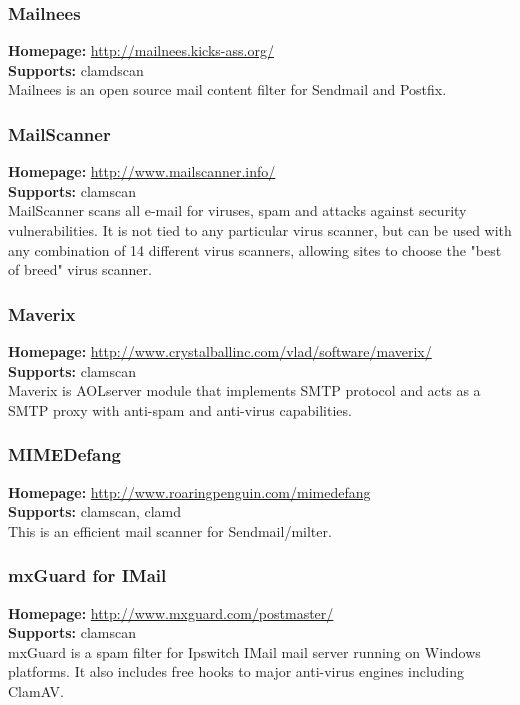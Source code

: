 \documentclass[a4paper,titlepage,12pt]{article}
\begin{document}
    \subsubsection{Mailnees}
    \textbf{Homepage:} \url{http://mailnees.kicks-ass.org/}\\
    \textbf{Supports:} clamdscan\\[4pt]
    Mailnees is an open source mail content filter for Sendmail and Postfix.

    \subsubsection{MailScanner}
    \textbf{Homepage:} \url{http://www.mailscanner.info/}\\
    \textbf{Supports:} clamscan\\[4pt]
    MailScanner scans all e-mail for viruses, spam and attacks against
    security vulnerabilities. It is not tied to any particular virus
    scanner, but can be used with any combination of 14 different virus
    scanners, allowing sites to choose the "best of breed" virus scanner.

    \subsubsection{Maverix}
    \textbf{Homepage:} \url{http://www.crystalballinc.com/vlad/software/maverix/}\\
    \textbf{Supports:} clamscan\\[4pt]
    Maverix is AOLserver module that implements SMTP protocol and acts as
    a SMTP proxy with anti-spam and anti-virus capabilities.

    \subsubsection{MIMEDefang}
    \textbf{Homepage:} \url{http://www.roaringpenguin.com/mimedefang}\\
    \textbf{Supports:} clamscan, clamd\\[4pt]
    This is an efficient mail scanner for Sendmail/milter.

    \subsubsection{mxGuard for IMail}
    \textbf{Homepage:} \url{http://www.mxguard.com/postmaster/}\\
    \textbf{Supports:} clamscan\\[4pt]
    mxGuard is a spam filter for Ipswitch IMail mail server running on Windows
    platforms. It also includes free hooks to major anti-virus engines
    including ClamAV.
\end{document}

